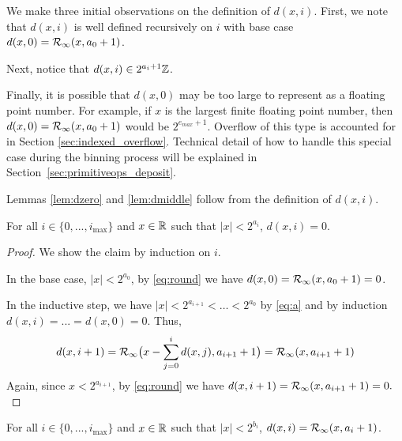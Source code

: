     We make three initial observations on the definition of $d(x, i)$. First,
    we note that $d(x, i)$ is well defined recursively on $i$ with base case
    $d(x, 0) = \mathcal{R}_\text{$\infty$}(x, a_0 + 1)$.

    Next, notice that $d(x, i) \in 2^{a_{i} + 1}\mathbb{Z}$.

    Finally, it is possible that $d(x, 0)$ may be too large to represent as a
    floating point number. For example, if $x$ is the largest finite floating point
    number, then $d(x,0)=\mathcal{R}_\text{$\infty$}(x, a_0+1)$ would be $2^{e_{max}+1}$.
    Overflow of this type is accounted for in Section \ref{sec:indexed_overflow}.
    Technical detail of how to handle this special case during the binning process
    will be explained in Section~\ref{sec:primitiveops_deposit}.

    Lemmas \ref{lem:dzero} and \ref{lem:dmiddle} follow from the definition of $d(x, i)$.

    \begin{samepage}
    \begin{lem}
      For all $i \in \{0, ..., i_{\max}\}$ and $x \in \mathbb{R}$ such that $|x| < 2^{a_i}$,
      $d(x, i) = 0.$
      \label{lem:dzero}
    \end{lem}
    \end{samepage}

    \begin{proof}
      We show the claim by induction on $i$.

      In the base case, $|x| < 2^{a_0}$, by \eqref{eq:round} we have
      $d(x, 0) = \mathcal{R}_\text{$\infty$}(x, a_0 + 1) = 0$.

      In the inductive step, we have $|x| < 2^{a_{i + 1}} < \ldots < 2^{a_0}$ by \eqref{eq:a}
      and by induction $d(x, i)= ... = d(x, 0) = 0$. Thus,
      \[
        d(x, i + 1) = \mathcal{R}_\text{$\infty$}\bigl(x - \sum\limits_{j = 0}^{i}d(x, j), a_{i + 1} + 1\bigr)
            = \mathcal{R}_\text{$\infty$}(x, a_{i+1} + 1)
      \]
      Again, since $x < 2^{a_{i+1}}$, by \eqref{eq:round} we have
      \(
        d(x, i + 1) = \mathcal{R}_\text{$\infty$}(x, a_{i + 1} + 1) = 0.
      \)
    \end{proof}

    \begin{samepage}
    \begin{lem}
      For all $i \in \{0, ..., i_{\max}\}$ and $x \in \mathbb{R}$ such that $|x| < 2^{b_i}$,
      $d(x, i) = \mathcal{R}_\text{$\infty$}(x, a_i + 1)$.
      \label{lem:dmiddle}
    \end{lem}
    \end{samepage}

